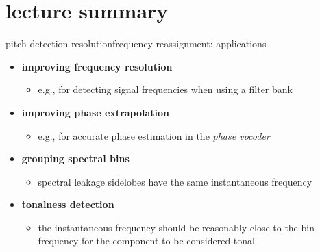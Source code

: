    \section[summary]{lecture summary}
        \begin{frame}{pitch detection resolution}{frequency reassignment: applications}
            \begin{itemize}
                \item \textbf{improving frequency resolution}
                    \begin{itemize}
                        \item e.g., for detecting signal frequencies when using a filter bank
                    \end{itemize}
                \smallskip
                \item<2-> \textbf{improving phase extrapolation}
                    \begin{itemize}
                        \item e.g., for accurate phase estimation in the \textit{phase vocoder}
                    \end{itemize}
                \smallskip
                \item<3-> \textbf{grouping spectral bins}
                    \begin{itemize}
                        \item spectral leakage sidelobes have the same instantaneous frequency
                    \end{itemize}
                \smallskip
                \item<4-> \textbf{tonalness detection}
                    \begin{itemize}
                        \item   the instantaneous frequency should be reasonably close to the bin frequency for the component to be considered tonal
                    \end{itemize}
            \end{itemize}
        \end{frame}

